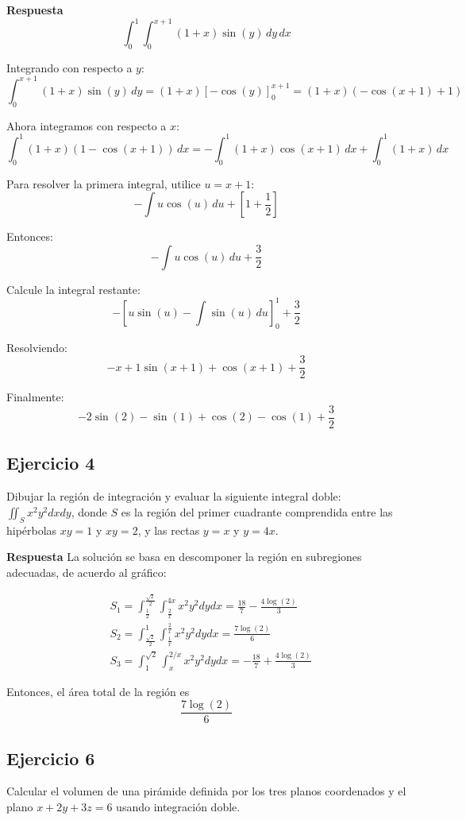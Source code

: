 \documentclass{report}
\begin{document}
\textbf{Respuesta}
\[
\int_{0}^{1} \int_{0}^{x+1} (1+x) \sin(y) \, dy \, dx
\]

Integrando con respecto a $y$:
\[
\int_{0}^{x+1} (1+x) \sin(y) \, dy = (1+x)[-\cos(y)]_{0}^{x+1} = (1+x) (-\cos(x+1) + 1)
\]

Ahora integramos con respecto a $x$:
\[
\int_{0}^{1} (1+x)(1 - \cos(x+1)) \, dx = -\int_{0}^{1} (1+x) \cos(x+1) \, dx + \int_{0}^{1} (1+x) \, dx
\]

Para resolver la primera integral, utilice $u = x+1$:
\[
-\int u \cos(u) \, du + \left[1 + \frac{1}{2}\right]
\]

Entonces:
\[
-\int u \cos(u) \, du + \frac{3}{2}
\]

Calcule la integral restante:
\[
-\left[ u \sin(u) - \int \sin(u) \, du \right]_{0}^{1} + \frac{3}{2}
\]

Resolviendo:
\[
-x+1 \sin(x+1) + \cos(x+1) + \frac{3}{2}
\]

Finalmente:
\[
-2 \sin(2) - \sin(1) + \cos(2) - \cos(1) + \frac{3}{2}
\]\subsection{Ejercicio 4}
Dibujar la región de integración y evaluar la siguiente integral doble: $\iint_{S} x^{2} y^{2} d x d y$, donde $S$ es la región del primer cuadrante comprendida entre las hipérbolas $xy=1$ y $xy=2$, y las rectas $y=x$ y $y=4x$.

\textbf{Respuesta}
La solución se basa en descomponer la región en subregiones adecuadas, de acuerdo al gráfico:

$$
\begin{aligned}
& S_1=\int_{\frac{1}{2}}^{\frac{\sqrt{2}}{2}} \int_{\frac{2}{x}}^{4 x} x^2 y^2 d y d x =  
\frac{18}{7} - \frac{4\log(2)}{3}
 \\
& S_2=\int_{\frac{\sqrt{2}}{2}}^1 \int_{\frac{1}{x}}^{\frac{2}{x}} x^2 y^2 d y d x = \frac{7\log(2)}{6}\\
& S_3=\int_1^{\sqrt{2}} \int_x^{2 / x} x^2 y^2 d y d x=-\frac{18}{7} + \frac{4\log(2)}{3}
\end{aligned}
$$

Entonces, el área total de la región es $$\frac{7\log(2)}{6}$$\subsection{Ejercicio 6}
Calcular el volumen de una pirámide definida por los tres planos coordenados y el plano $x+2y+3z=6$ usando integración doble.
\end{document}
